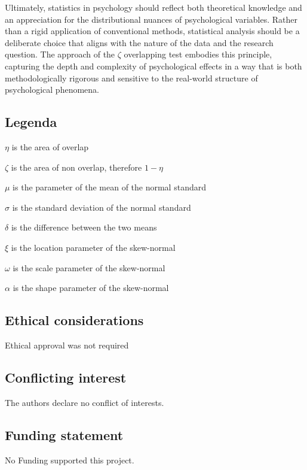 \documentclass[twocolumn]{article}\usepackage[]{graphicx}\usepackage[]{xcolor}
\begin{document}
Ultimately, statistics in psychology should reflect both theoretical knowledge and an appreciation for the distributional nuances of psychological variables. Rather than a rigid application of conventional methods, statistical analysis should be a deliberate choice that aligns with the nature of the data and the research question. The approach of the $\zeta$ overlapping test embodies this principle, capturing the depth and complexity of psychological effects in a way that is both methodologically rigorous and sensitive to the real-world structure of psychological phenomena.

\subsection*{Legenda}

$\eta$ is the area of overlap

\noindent $\zeta$ is the area of non overlap, therefore $1 - \eta$

\noindent $\mu$ is the parameter of the mean of the normal standard 

\noindent $\sigma$ is the standard deviation of the normal standard

\noindent $\delta$ is the difference between the two means

\noindent $\xi$ is the location parameter of the skew-normal

\noindent $\omega$ is the scale parameter of the skew-normal

\noindent $\alpha$ is the shape parameter of the skew-normal


\subsection*{Ethical considerations}
Ethical approval was not required

\subsection*{Conflicting interest}
The authors declare no conflict of interests.

\subsection*{Funding statement}
No Funding supported this project.



\end{document}
